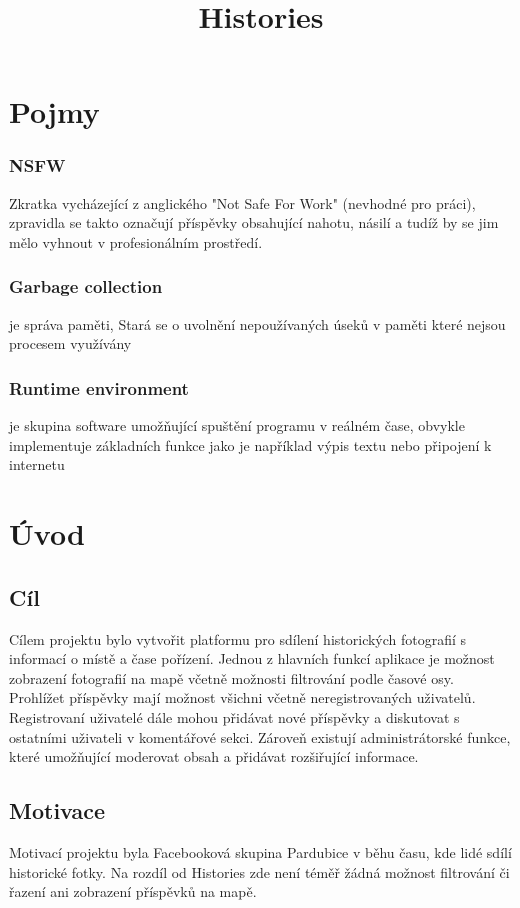 \documentclass[12pt, a4paper,
 twoside,        %
 openright
]{report}
\title{Histories} %
\author{\name} %
\date{\publicationYear} %
\begin{document}
\pagestyle{empty}



\chapter{Pojmy}
\subsection{NSFW}
Zkratka vycházející z anglického "Not Safe For Work" (nevhodné pro práci), zpravidla se takto označují příspěvky obsahující nahotu, násilí a tudíž by se jim mělo vyhnout v profesionálním prostředí. \cite{NSFW}

\subsection{Garbage collection} je správa paměti, Stará se o uvolnění nepoužívaných úseků v paměti které nejsou procesem využívány \cite{GarbageCollection}

\subsection{Runtime environment} je skupina software umožňující spuštění programu v reálném čase, obvykle implementuje základních funkce jako je například výpis textu nebo připojení k internetu \cite{whatIsRuntimeEnvironment}


\chapter{Úvod}
\section{Cíl}
Cílem projektu bylo vytvořit platformu pro sdílení historických fotografií
s informací o místě a čase pořízení. Jednou z hlavních funkcí aplikace je možnost
zobrazení fotografií na mapě včetně možnosti filtrování podle časové osy. Prohlížet příspěvky mají možnost všichni včetně neregistrovaných uživatelů. Registrovaní uživatelé dále mohou přidávat nové příspěvky a diskutovat s ostatními uživateli v
komentářové sekci. Zároveň existují administrátorské funkce, které umožňující  moderovat obsah a přidávat rozšiřující informace.

\section{Motivace}
Motivací projektu byla Facebooková skupina Pardubice v běhu času\cite{PardubiceVBehuCasuFB}, kde lidé
sdílí historické fotky. Na rozdíl od Histories zde není téměř žádná možnost filtrování či
řazení ani zobrazení příspěvků na mapě.
\end{document}
